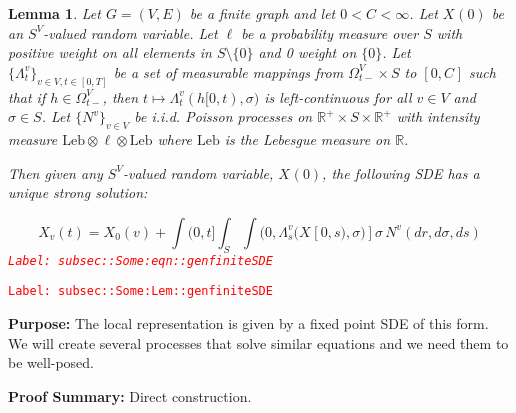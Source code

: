 \documentclass[12pt]{article}
\newcommand{\mb}{\mathbb}
\newcommand{\te}{\text}
\newcommand{\tr}{\textcolor{red}}
\newcommand{\labe}[1]{\tr{\texttt{Label: #1}}}
\newcommand{\purpose}{\textbf{Purpose: }}
\newcommand{\pfsum}{\textbf{Proof Summary: }}
\newcommand{\ind}{\hspace{24pt}}
\renewcommand{\v}{v}							%
\renewcommand{\S}{S}							%
\newcommand{\s}{\sigma}							%
\newcommand{\T}{T}								%
\renewcommand{\t}{t}							%
\newcommand{\sset}{\Omega}						%
\renewcommand{\tt}{s}							%
\newcommand{\X}{X}								%
\newcommand{\vind}[1]{^{#1}}					%
\newcommand{\carp}[1]{^{#1}}					%
\newcommand{\vsi}[1]{^{#1}}						%
\newcommand{\cind}[1]{_{#1}}					%
\newcommand{\tp}[1]{(#1)}						%
\newcommand{\tip}[1]{#1}						%
\newcommand{\ts}[1]{_{#1}}						%
\newcommand{\const}{C}							%
\newcommand{\poiss}{N}							%
\newcommand{\leb}{\te{Leb}}						%
\newcommand{\Sm}{\ell}							%
\renewcommand{\r}{r}							%
\newcommand{\indx}[1]{_{#1}}					%
\newcommand{\ratee}{\Lambda}					%
\newtheorem{lem}[thms]{Lemma}
\begin{document}
\begin{lem}
Let \(G = (V,E)\) be a finite graph and let \(0 < \const\indx{}< \infty\). Let \(\X\cind{}\tp{0}\) be an \(\S\carp{V}\)-valued random variable. Let \(\Sm\) be a probability measure over \(\S\) with positive weight on all elements in \(\S\setminus\{0\}\) and 0 weight on \(\{0\}\). Let \(\{\ratee\ts{\t}\vind{\v}\}_{\v \in V,\t\in [0,\T]}\) be a set of measurable mappings from \(\sset\vsi{V}\ts{\t-} \times \S\) to \([0,\const\indx{}]\) such that if \(h \in \sset\vsi{V}\ts{\t-}\), then \(\t\mapsto \ratee\ts{\t}\vind{\v}(h[0,\t),\s)\) is left-continuous for all \(\v \in V\) and \(\s \in \S\). Let \(\{\poiss\vind{\v}\}_{\v \in V}\) be i.i.d. Poisson processes on \(\mb{R}^+\times \S\times\mb{R}^+\) with intensity measure \(\leb\otimes\Sm\otimes\leb\) where \(\leb\) is the Lebesgue measure on \(\mb{R}\).

\ind Then given any \(\S\carp{V}\)-valued random variable, \(\X\cind{}\tp{0}\), the following SDE has a unique strong solution:

\begin{equation}
\X\cind{\v}\tp{\t} = \X\cind{0}\tp{\v} + \int{(0,\t]}\int_\S\int{(0,\ratee\ts{\tt}\vind{\v}(\X\cind{}\tip{[0,\tt)},\s)]}  \s\,\poiss\vind{\v}(d\r,d\s,d\tt)
\label{subsec::Some:eqn::genfiniteSDE}
\end{equation}
\labe{subsec::Some:eqn::genfiniteSDE}
\label{subsec::Some:Lem::genfiniteSDE}
\end{lem}
\labe{subsec::Some:Lem::genfiniteSDE}

\purpose The local representation is given by a fixed point SDE of this form. We will create several processes that solve similar equations and we need them to be well-posed.

\pfsum Direct construction.
\end{document}
